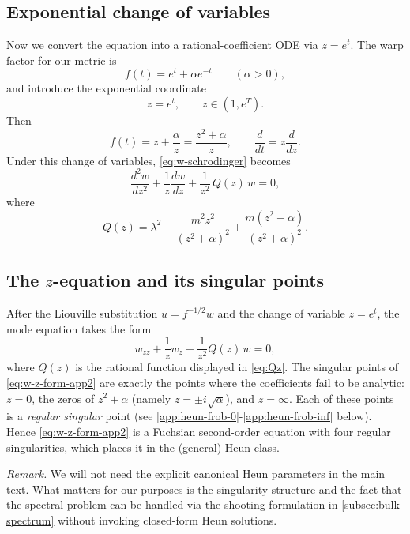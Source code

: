 \documentclass[11pt]{article}
\theoremstyle{definition}
\numberwithin{equation}{section}
\begin{document}
\subsection{Exponential change of variables}\label{app:heun-exp}
Now we convert the equation into a rational-coefficient ODE via $z=e^t$.
The warp factor for our metric is
\begin{equation}
f(t)=e^{t}+\alpha e^{-t}\qquad (\alpha>0),
\end{equation}
and introduce the exponential coordinate
\begin{equation}\label{eq:z-exp}
z=e^{t},\qquad z\in (1,e^{T}).
\end{equation}
Then
\begin{equation}
f(t)=z+\frac{\alpha}{z}=\frac{z^2+\alpha}{z},\qquad
\frac{d}{dt}=z\frac{d}{dz}.
\end{equation}
Under this change of variables, \eqref{eq:w-schrodinger} becomes
\begin{equation}\label{eq:w-z-form}
\frac{d^2 w}{dz^2}+\frac{1}{z}\frac{dw}{dz}+\frac{1}{z^2}\,Q(z)\,w=0,
\end{equation}
where
\begin{equation}\label{eq:Qz}
Q(z)=
\lambda^2
-\frac{m^2 z^2}{(z^2+\alpha)^2}
+\frac{m(z^2-\alpha)}{(z^2+\alpha)^2}.
\end{equation}



\subsection{The \(z\)-equation and its singular points}\label{app:heun-z-sing}
After the Liouville substitution \(u=f^{-1/2}w\) and the change of variable \(z=e^t\), the mode equation takes the form
\begin{equation}\label{eq:w-z-form-app2}
w_{zz}+\frac{1}{z}w_{z}+\frac{1}{z^{2}}Q(z)\,w=0,
\end{equation}
where \(Q(z)\) is the rational function displayed in \eqref{eq:Qz}. The singular points of
\eqref{eq:w-z-form-app2} are exactly the points where the coefficients fail to be analytic: \(z=0\), the zeros of
\(z^{2}+\alpha\) (namely \(z=\pm i\sqrt{\alpha}\)), and \(z=\infty\). Each of these points is a \emph{regular singular}
point (see \autoref{app:heun-frob-0}-\ref{app:heun-frob-inf} below). Hence \eqref{eq:w-z-form-app2} is a Fuchsian
second-order equation with four regular singularities, which places it in the (general) Heun class.

\medskip\noindent
\emph{Remark.} We will not need the explicit canonical Heun parameters in the main text. What matters for our purposes
is the singularity structure and the fact that the spectral problem can be handled via the shooting formulation in \autoref{subsec:bulk-spectrum} without invoking closed-form Heun solutions.
\end{document}
